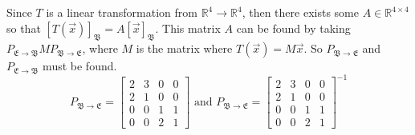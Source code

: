 \documentclass{report}
\begin{document}
\sol Since $T$ is a linear transformation from $\mathbb{R}^4\rightarrow\mathbb{R}^4$, then there exists some $A\in\mathbb{R}^{4\times4}$ so that $[T(\vec{x})]_{\mathfrak{B}}=A[\vec{x}]_{\mathfrak{B}}$. This matrix $A$ can be found by taking $P_{\mathfrak{E}\rightarrow\mathfrak{B}}MP_{\mathfrak{B}\rightarrow\mathfrak{E}}$, where $M$ is the matrix where $T(\vec{x})=M\vec{x}$. So $P_{\mathfrak{B}\rightarrow\mathfrak{E}}$ and $P_{\mathfrak{E}\rightarrow\mathfrak{B}}$ must be found.
$$
P_{\mathfrak{B}\rightarrow\mathfrak{E}} = 
\begin{bmatrix}
2 & 3 & 0 & 0 \\
2 & 1 & 0 & 0 \\
0 & 0 & 1 & 1 \\
0 & 0 & 2 & 1
\end{bmatrix} \text{ and }
P_{\mathfrak{B}\rightarrow\mathfrak{E}} = 
\begin{bmatrix}
2 & 3 & 0 & 0 \\
2 & 1 & 0 & 0 \\
0 & 0 & 1 & 1 \\
0 & 0 & 2 & 1
\end{bmatrix}^{-1}
$$
\end{document}
